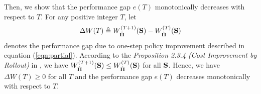 Then, we show that the performance gap $e(T)$ monotonically decreases with respect to $T$.
For any positive integer $T$, let
{\small
\begin{align*}
    \Delta{W}(T) \triangleq W^{(T+1)}_{\hat{\boldsymbol{\Pi}}}(\mathbf{S}) - W^{(T)}_{\hat{\boldsymbol{\Pi}}}(\mathbf{S})
\end{align*}
}%
denotes the performance gap due to one-step policy improvement described in equation (\ref{eqn:partial}).
According to the \emph{Proposition 2.3.4 (Cost Improvement by Rollout)} in \cite{dp-control}, we have $W^{(T+1)}_{\hat{\boldsymbol{\Pi}}}(\mathbf{S}) \leq W^{(T)}_{\hat{\boldsymbol{\Pi}}}(\mathbf{S})$ for all $\mathbf{S}$.
Hence, we have $\Delta{W}(T) \geq 0$ for all $T$ and the performance gap $e(T)$ decreases monotonically with respect to $T$.
